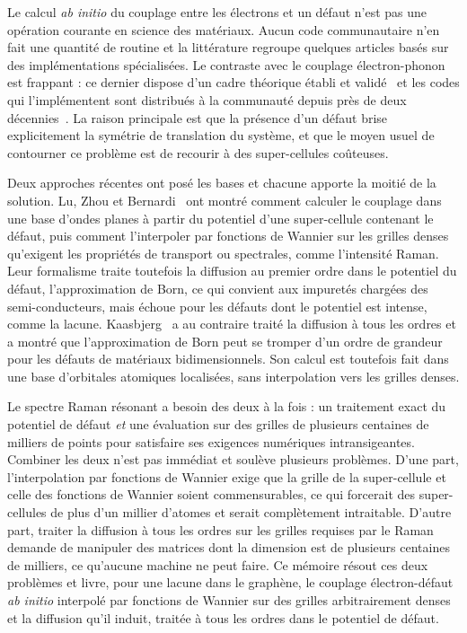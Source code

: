 \bigskip
{}

Le calcul \textit{ab initio} du couplage entre les électrons et un défaut n'est pas une opération courante en science des matériaux. Aucun code communautaire n'en fait une quantité de routine et la littérature regroupe quelques articles basés sur des implémentations spécialisées. Le contraste avec le couplage électron-phonon est frappant : ce dernier dispose d'un cadre théorique établi et validé~\cite{giustinoElectronphononInteractionsFirst2017,giustinoElectronphononInteractionUsing2007} et les codes qui l'implémentent sont distribués à la communauté depuis près de deux décennies~\cite{ponceEPWElectronphononCoupling2016,leeElectronPhononPhysics2023a,zhouPerturboSoftwarePackage2021,gonzeAbinitProjectImpact2020,bruninPhononlimitedElectronMobility2020}. La raison principale est que la présence d'un défaut brise explicitement la symétrie de translation du système, et que le moyen usuel de contourner ce problème est de recourir à des super-cellules coûteuses.

Deux approches récentes ont posé les bases et chacune apporte la moitié de la solution. Lu, Zhou et Bernardi~\cite{luEfficientInitioCalculations2019,luInitioElectrondefectInteractions2020} ont montré comment calculer le couplage dans une base d'ondes planes à partir du potentiel d'une super-cellule contenant le défaut, puis comment l'interpoler par fonctions de Wannier sur les grilles denses qu'exigent les propriétés de transport ou spectrales, comme l'intensité Raman. Leur formalisme traite toutefois la diffusion au premier ordre dans le potentiel du défaut, l'approximation de Born, ce qui convient aux impuretés chargées des semi-conducteurs, mais échoue pour les défauts dont le potentiel est intense, comme la lacune. Kaasbjerg~\cite{kaasbjergAtomisticMatrixTheory2020} a au contraire traité la diffusion à tous les ordres et a montré que l'approximation de Born peut se tromper d'un ordre de grandeur pour les défauts de matériaux bidimensionnels. Son calcul est toutefois fait dans une base d'orbitales atomiques localisées, sans interpolation vers les grilles denses.

Le spectre Raman résonant a besoin des deux à la fois : un traitement exact du potentiel de défaut \textit{et} une évaluation sur des grilles de plusieurs centaines de milliers de points pour satisfaire ses exigences numériques intransigeantes. Combiner les deux n'est pas immédiat et soulève plusieurs problèmes. D'une part, l'interpolation par fonctions de Wannier exige que la grille de la super-cellule et celle des fonctions de Wannier soient commensurables, ce qui forcerait des super-cellules de plus d'un millier d'atomes et serait complètement intraitable. D'autre part, traiter la diffusion à tous les ordres sur les grilles requises par le Raman demande de manipuler des matrices dont la dimension est de plusieurs centaines de milliers, ce qu'aucune machine ne peut faire. Ce mémoire résout ces deux problèmes et livre, pour une lacune dans le graphène, le couplage électron-défaut \textit{ab initio} interpolé par fonctions de Wannier sur des grilles arbitrairement denses et la diffusion qu'il induit, traitée à tous les ordres dans le potentiel de défaut.


